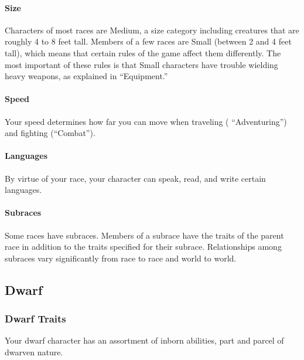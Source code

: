\hypertarget{size}{%
\paragraph{Size}\label{size}}

Characters of most races are Medium, a size category including creatures
that are roughly 4 to 8 feet tall. Members of a few races are Small
(between 2 and 4 feet tall), which means that certain rules of the game
affect them differently. The most important of these rules is that Small
characters have trouble wielding heavy weapons, as explained in
``Equipment.''

\hypertarget{speed}{%
\paragraph{Speed}\label{speed}}

Your speed determines how far you can move when traveling (
``Adventuring'') and fighting (``Combat'').

\hypertarget{languages}{%
\paragraph{Languages}\label{languages}}

By virtue of your race, your character can speak, read, and write
certain languages.

\hypertarget{subraces}{%
\paragraph{Subraces}\label{subraces}}

Some races have subraces. Members of a subrace have the traits of the
parent race in addition to the traits specified for their subrace.
Relationships among subraces vary significantly from race to race and
world to world.

\hypertarget{dwarf}{%
\subsection{Dwarf}\label{dwarf}}

\hypertarget{dwarf-traits}{%
\subsubsection{Dwarf Traits}\label{dwarf-traits}}

Your dwarf character has an assortment of inborn abilities, part and
parcel of dwarven nature.

